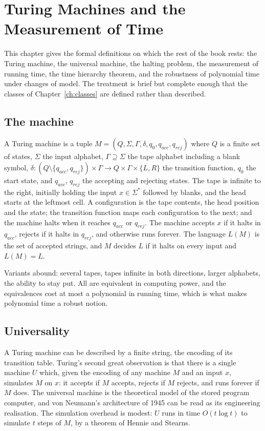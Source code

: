\chapter{Turing Machines and the Measurement of Time}
\label{ch:turing}

This chapter gives the formal definitions on which the rest of the book rests: the Turing machine, the universal machine, the halting problem, the measurement of running time, the time hierarchy theorem, and the robustness of polynomial time under changes of model. The treatment is brief but complete enough that the classes of Chapter~\ref{ch:classes} are defined rather than described.

\section{The machine}

A Turing machine is a tuple $M = (Q, \Sigma, \Gamma, \delta, q_0, q_{acc}, q_{rej})$ where $Q$ is a finite set of states, $\Sigma$ the input alphabet, $\Gamma \supseteq \Sigma$ the tape alphabet including a blank symbol, $\delta : (Q \setminus \{q_{acc}, q_{rej}\}) \times \Gamma \to Q \times \Gamma \times \{L, R\}$ the transition function, $q_0$ the start state, and $q_{acc}$, $q_{rej}$ the accepting and rejecting states. The tape is infinite to the right, initially holding the input $x \in \Sigma^*$ followed by blanks, and the head starts at the leftmost cell. A configuration is the tape contents, the head position and the state; the transition function maps each configuration to the next; and the machine halts when it reaches $q_{acc}$ or $q_{rej}$. The machine accepts $x$ if it halts in $q_{acc}$, rejects if it halts in $q_{rej}$, and otherwise runs forever. The language $L(M)$ is the set of accepted strings, and $M$ decides $L$ if it halts on every input and $L(M) = L$.

Variants abound: several tapes, tapes infinite in both directions, larger alphabets, the ability to stay put. All are equivalent in computing power, and the equivalences cost at most a polynomial in running time, which is what makes polynomial time a robust notion.

\section{Universality}

A Turing machine can be described by a finite string, the encoding of its transition table. Turing's second great observation is that there is a single machine $U$ which, given the encoding of any machine $M$ and an input $x$, simulates $M$ on $x$: it accepts if $M$ accepts, rejects if $M$ rejects, and runs forever if $M$ does. The universal machine is the theoretical model of the stored program computer, and von Neumann's architecture of 1945 can be read as its engineering realisation. The simulation overhead is modest: $U$ runs in time $O(t \log t)$ to simulate $t$ steps of $M$, by a theorem of Hennie and Stearns.

